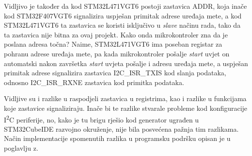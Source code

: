 Vidljivo je također da kod STM32L471VGT6 postoji zastavica ADDR, koja inače kod STM32F407VGT6 signalizira uspješan primitak adrese uređaja mete, a kod \newline STM32L471VGT6 ta zastavica se koristi isključivo u \textit{slave} načinu rada, tako da ta zastavica nije bitna za ovaj projekt. Kako onda mikrokontroler zna da je poslana adresa točna? Naime, STM32L471VGT6 ima poseban registar za pohranu adrese uređaja mete, pa kada mikrokontroler pošalje \textit{start} uvjet on automatski nakon završetka \textit{start} uvjeta pošalje i adresu uređaja mete, a uspješan primitak adrese signalizira zastavica I2C\_ISR\_TXIS kod slanja podataka, odnosno I2C\_ISR\_RXNE zastavica kod primitka podataka.

Vidljive su i razlike u raspodjeli zastavica u registrima, kao i razlike u funkcijama koje zastavice signaliziraju. Inače bi te razlike stvarale probleme kod konfiguracije I\textsuperscript{2}C periferije, no, kako je tu brigu rješio kod generator ugrađen u STM32CubeIDE razvojno okruženje, nije bila posvećena pažnja tim razlikama. Način implementacije spomenutih razlika u programsku podršku opisan je u poglavlju z.